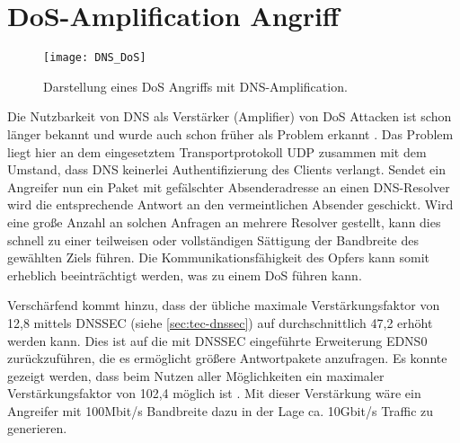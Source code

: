 \section{DoS-Amplification Angriff}
\label{sec:attack-dosamp}
\begin{wrapfigure}{r}{0.35\textwidth}
    \begin{center}
        \texttt{[image: DNS\_DoS]}
    \end{center}
    \caption{Darstellung eines DoS Angriffs mit DNS-Amplification.}
    \label{img:dnsdos}
\end{wrapfigure}

Die Nutzbarkeit von DNS als Verstärker (Amplifier) von \ac{DoS} Attacken ist schon länger bekannt und wurde auch schon früher als Problem erkannt \cite{ICANN2006}. Das Problem liegt hier an dem eingesetztem Transportprotokoll UDP zusammen mit dem Umstand, dass DNS keinerlei Authentifizierung des Clients verlangt. Sendet ein Angreifer nun ein Paket mit gefälschter Absenderadresse an einen DNS-Resolver wird die entsprechende Antwort an den vermeintlichen Absender geschickt. Wird eine große Anzahl an solchen Anfragen an mehrere Resolver gestellt, kann dies schnell zu einer teilweisen oder vollständigen Sättigung der Bandbreite des gewählten Ziels führen. Die Kommunikationsfähigkeit des Opfers kann somit erheblich beeinträchtigt werden, was zu einem \ac{DoS} führen kann. 

Verschärfend kommt hinzu, dass der übliche maximale Verstärkungsfaktor von 12,8 mittels \ac{DNSSEC} (siehe \ref{sec:tec-dnssec}) auf durchschnittlich 47,2 erhöht werden kann. Dies ist auf die mit \ac{DNSSEC} eingeführte Erweiterung EDNS0 zurückzuführen, die es ermöglicht größere Antwortpakete anzufragen. Es konnte gezeigt werden, dass beim Nutzen aller Möglichkeiten ein maximaler Verstärkungsfaktor von 102,4 möglich ist \cite{VanRijswijk-Deij2014}. Mit dieser Verstärkung wäre ein Angreifer mit 100Mbit/s Bandbreite dazu in der Lage ca. 10Gbit/s Traffic zu generieren.

